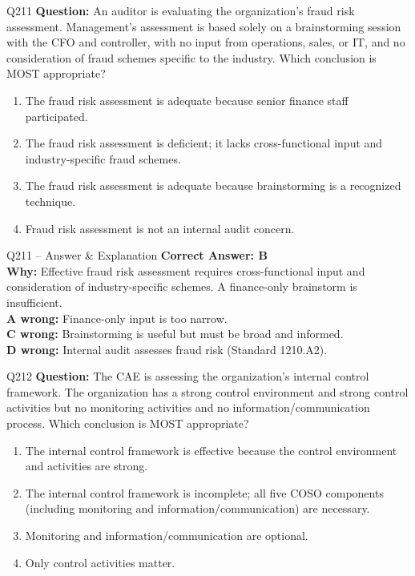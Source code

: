 \documentclass[aspectratio=169,10pt]{beamer}
\begin{document}
	\begin{frame}[t]{Q211}
		\small
		\textbf{Question:} An auditor is evaluating the organization's fraud risk assessment. Management's assessment is based solely on a brainstorming session with the CFO and controller, with no input from operations, sales, or IT, and no consideration of fraud schemes specific to the industry. Which conclusion is MOST appropriate?
		\begin{enumerate}[label=\Alph*.,itemsep=1pt,topsep=2pt]
			\item The fraud risk assessment is adequate because senior finance staff participated.
			\item The fraud risk assessment is deficient; it lacks cross-functional input and industry-specific fraud schemes.
			\item The fraud risk assessment is adequate because brainstorming is a recognized technique.
			\item Fraud risk assessment is not an internal audit concern.
		\end{enumerate}
	\end{frame}
	
	\begin{frame}[t]{Q211 -- Answer \& Explanation}
		\small
		\textbf{Correct Answer: B} \\[4pt]
		\textbf{Why:} Effective fraud risk assessment requires cross-functional input and consideration of industry-specific schemes. A finance-only brainstorm is insufficient. \\[4pt]
		\textbf{A wrong:} Finance-only input is too narrow. \\[2pt]
		\textbf{C wrong:} Brainstorming is useful but must be broad and informed. \\[2pt]
		\textbf{D wrong:} Internal audit assesses fraud risk (Standard 1210.A2).
	\end{frame}
	
	\begin{frame}[t]{Q212}
		\small
		\textbf{Question:} The CAE is assessing the organization's internal control framework. The organization has a strong control environment and strong control activities but no monitoring activities and no information/communication process. Which conclusion is MOST appropriate?
		\begin{enumerate}[label=\Alph*.,itemsep=1pt,topsep=2pt]
			\item The internal control framework is effective because the control environment and activities are strong.
			\item The internal control framework is incomplete; all five COSO components (including monitoring and information/communication) are necessary.
			\item Monitoring and information/communication are optional.
			\item Only control activities matter.
		\end{enumerate}
	\end{frame}
	
\end{document}
